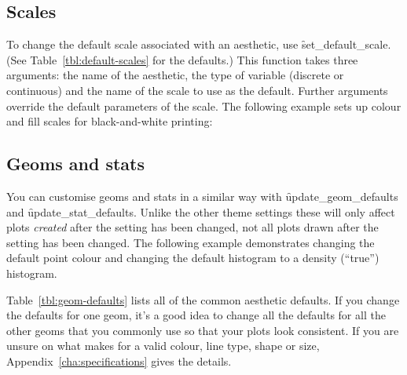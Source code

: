 \subsection{Scales}
\label{sub:customise-scales}

To change the default scale associated with an aesthetic, use \f{set_default_scale}. (See Table~\ref{tbl:default-scales} for the defaults.)  This function takes three arguments: the name of the aesthetic, the type of variable (discrete or continuous) and the name of the scale to use as the default.  Further arguments override the default parameters of the scale.  The following example sets up colour and fill scales for black-and-white printing:

% 


\subsection{Geoms and stats}
\label{sub:geoms_and_stats}

You can customise geoms and stats in a similar way with \f{update_geom_defaults} and \f{update_stat_defaults}.  Unlike the other theme settings these will only affect plots \emph{created} after the setting has been changed, not all plots drawn after the setting has been changed.  The following example demonstrates changing the default point colour and changing the default histogram to a density (``true'') histogram.  

% 


Table~\ref{tbl:geom-defaults} lists all of the common aesthetic defaults.  If you change the defaults for one geom, it's a good idea to change all the defaults for all the other geoms that you commonly use so that your plots look consistent.  If you are unsure on what makes for a valid colour, line type, shape or size, Appendix~\ref{cha:specifications} gives the details.

% 

